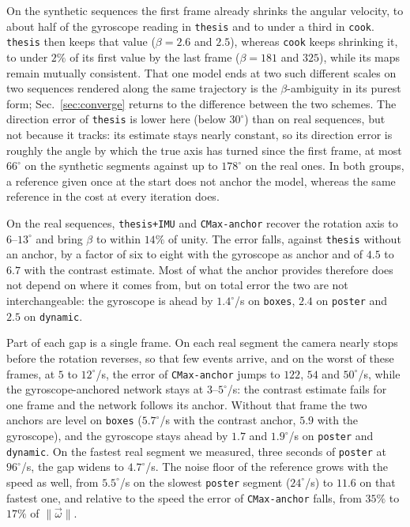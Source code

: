 \documentclass[journal]{IEEEtran}
\newcommand{\wvec}{\vec{\omega}}
\begin{document}
On the synthetic sequences the first frame already shrinks the angular velocity, to about half of the gyroscope reading in \texttt{thesis} and to under a third in \texttt{cook}. \texttt{thesis} then keeps that value ($\beta = 2.6$ and $2.5$), whereas \texttt{cook} keeps shrinking it, to under $2\%$ of its first value by the last frame ($\beta = 181$ and $325$), while its maps remain mutually consistent. That one model ends at two such different scales on two sequences rendered along the same trajectory is the $\beta$-ambiguity in its purest form; Sec.~\ref{sec:converge} returns to the difference between the two schemes. The direction error of \texttt{thesis} is lower here (below $30^\circ$) than on real sequences, but not because it tracks: its estimate stays nearly constant, so its direction error is roughly the angle by which the true axis has turned since the first frame, at most $66^\circ$ on the synthetic segments against up to $178^\circ$ on the real ones. In both groups, a reference given once at the start does not anchor the model, whereas the same reference in the cost at every iteration does.

On the real sequences, \texttt{thesis+IMU} and \texttt{CMax-anchor} recover the rotation axis to $6$--$13^\circ$ and bring $\beta$ to within $14\%$ of unity. The error falls, against \texttt{thesis} without an anchor, by a factor of six to eight with the gyroscope as anchor and of $4.5$ to $6.7$ with the contrast estimate. Most of what the anchor provides therefore does not depend on where it comes from, but on total error the two are not interchangeable: the gyroscope is ahead by $1.4^\circ$/s on \texttt{boxes}, $2.4$ on \texttt{poster} and $2.5$ on \texttt{dynamic}. 

Part of each gap is a single frame. On each real segment the camera nearly stops before the rotation reverses, so that few events arrive, and on the worst of these frames, at $5$ to $12^\circ$/s, the error of \texttt{CMax-anchor} jumps to $122$, $54$ and $50^\circ$/s, while the gyroscope-anchored network stays at $3$--$5^\circ$/s: the contrast estimate fails for one frame and the network follows its anchor. Without that frame the two anchors are level on \texttt{boxes} ($5.7^\circ$/s with the contrast anchor, $5.9$ with the gyroscope), and the gyroscope stays ahead by $1.7$ and $1.9^\circ$/s on \texttt{poster} and \texttt{dynamic}. On the fastest real segment we measured, three seconds of \texttt{poster} at $96^\circ$/s, the gap widens to $4.7^\circ$/s. The noise floor of the reference grows with the speed as well, from $5.5^\circ$/s on the slowest \texttt{poster} segment ($24^\circ$/s) to $11.6$ on that fastest one, and relative to the speed the error of \texttt{CMax-anchor} falls, from $35\%$ to $17\%$ of $\|\wvec\|$.
\end{document}
